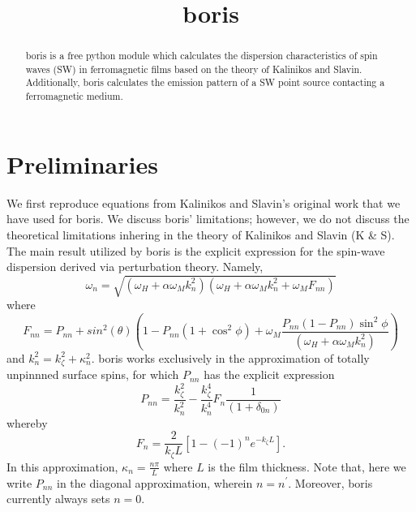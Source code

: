 \documentclass{article}
\title{boris}
\begin{document}
\maketitle
\begin{abstract}
boris is a free python module which calculates the dispersion characteristics of spin waves (SW) in ferromagnetic films based on the theory of Kalinikos and Slavin. Additionally, boris calculates the emission pattern of a SW point source contacting a ferromagnetic medium. 
\end{abstract}
\section{Preliminaries}
We first reproduce equations from Kalinikos and Slavin's original work that we have used for boris. We discuss boris' limitations; however, we do not discuss the theoretical limitations inhering in the theory of Kalinikos and Slavin (K \& S). The main result utilized by boris is the explicit expression for the spin-wave dispersion derived via perturbation theory. Namely,
\begin{equation}\label{dispersion_main}
\omega_{n} = \sqrt{(\omega_{H} + \alpha \omega_{M} k_{n}^2)(\omega_{H} + \alpha \omega_{M} k_{n}^2 + \omega_{M} F_{nn})}
\end{equation}
where
\begin{equation}
F_{nn} = P_{nn} + sin^2(\theta) \left(1 - P_{nn} \left( 1 + \cos^2{\phi}\right) + \omega_{M} \frac{P_{nn}(1-P_{nn})\sin^2{\phi}}{(\omega_{H} + \alpha \omega_{M} k_{n}^2)} \right)
\end{equation}
and $k_{n}^2 = k_{\zeta}^2 + \kappa_{n}^2$. boris works exclusively in the approximation of totally unpinnned surface spins, for which $P_{nn}$ has the explicit expression
\begin{equation}
P_{nn} = \frac{k_{\zeta}^2}{k_{n}^2} - \frac{k_{\zeta}^4}{k_{n}^4} F_{n} \frac{1}{(1 + \delta_{0n})}
\end{equation}
whereby
\begin{equation}
F_{n} = \frac{2}{k_{\zeta}L} [1 - (-1)^n e^{-k_{\zeta}L}].
\end{equation}
In this approximation, $\kappa_{n} = \frac{n \pi}{L}$ where $L$ is the film thickness. 
Note that, here we write $P_{nn}$ in the diagonal approximation, wherein $n = n^{\prime}$. 
Moreover, boris currently always sets $n = 0$.
\end{document}
